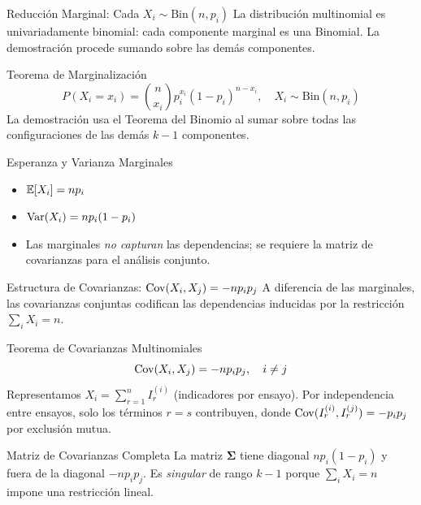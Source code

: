 \documentclass[10pt, aspectratio=169]{beamer}
\begin{document}
\begin{frame}{Reducción Marginal: Cada $X_{i} \sim \text{Bin}(n, p_{i})$}
  \footnotesize
  La distribución multinomial es univariadamente binomial: cada componente marginal es una Binomial. La demostración procede sumando sobre las demás componentes. \pause

  \vspace{0.1cm}
  \begin{block}{Teorema de Marginalización}
    $$P(X_{i} = x_{i}) = \binom{n}{x_{i}} p_{i}^{x_{i}} (1 - p_{i})^{n - x_{i}}, \quad X_{i} \sim \text{Bin}(n, p_{i})$$
    La demostración usa el Teorema del Binomio al sumar sobre todas las configuraciones de las demás $k - 1$ componentes.
  \end{block}

  \vspace{0.1cm}
  \pause
  \begin{alertblock}{Esperanza y Varianza Marginales}
    \begin{itemize}\itemsep=0.05cm
      \item $\mathbb{E}[X_{i}] = n p_{i}$
      \item $\operatorname{Var}(X_{i}) = n p_{i} (1 - p_{i})$
      \item Las marginales \emph{no capturan} las dependencias; se requiere la matriz de covarianzas para el análisis conjunto.
    \end{itemize}
  \end{alertblock}
\end{frame}

\begin{frame}{Estructura de Covarianzas: $\operatorname{Cov}(X_{i}, X_{j}) = -n p_{i} p_{j}$}
  \footnotesize
  A diferencia de las marginales, las covarianzas conjuntas codifican las dependencias inducidas por la restricción $\sum_{i} X_{i} = n$. \pause

  \vspace{0.1cm}
  \begin{block}{Teorema de Covarianzas Multinomiales}
    $$\operatorname{Cov}(X_{i}, X_{j}) = -n p_{i} p_{j}, \quad i \neq j$$
    Representamos $X_{i} = \sum_{r=1}^{n} I_{r}^{(i)}$ (indicadores por ensayo). Por independencia entre ensayos, solo los términos $r = s$ contribuyen, donde $\operatorname{Cov}(I_{r}^{(i)}, I_{r}^{(j)}) = -p_{i} p_{j}$ por exclusión mutua.
  \end{block}

  \vspace{0.1cm}
  \pause
  \begin{alertblock}{Matriz de Covarianzas Completa}
    La matriz $\bm{\Sigma}$ tiene diagonal $np_{i}(1-p_{i})$ y fuera de la diagonal $-np_{i}p_{j}$. Es \emph{singular} de rango $k - 1$ porque $\sum_{i} X_{i} = n$ impone una restricción lineal.
  \end{alertblock}
\end{frame}
\end{document}
